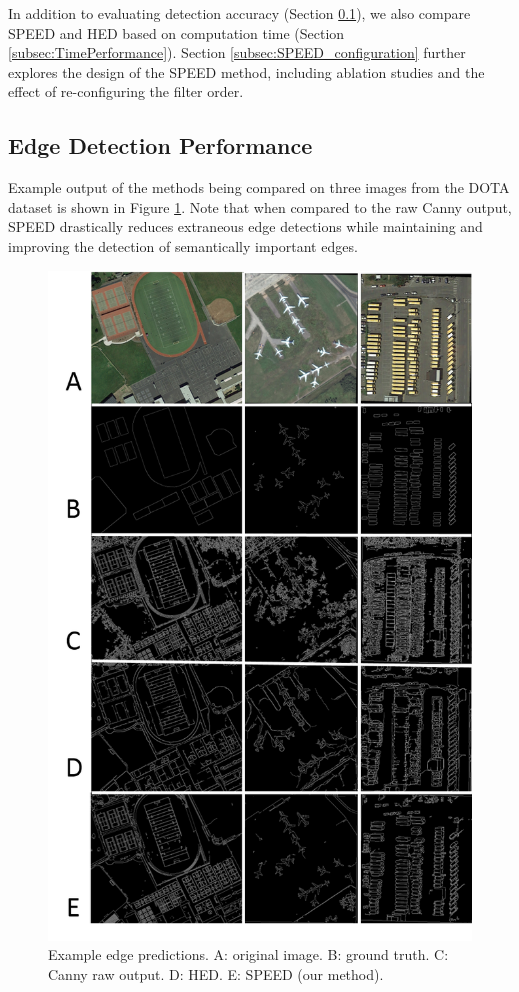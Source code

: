 \documentclass[conference]{IEEEtran}
\begin{document}
In addition to evaluating detection accuracy (Section \ref{subsec:DetectionPerformance}), we also compare SPEED and HED based on computation time (Section \ref{subsec:TimePerformance}). Section \ref{subsec:SPEED_configuration} further explores the design of the SPEED method, including ablation studies and the effect of re-configuring the filter order.

\subsection{Edge Detection Performance}
\label{subsec:DetectionPerformance}

Example output of the methods being compared on three images from the DOTA dataset is shown in Figure \ref{fig:image_stitch}. Note that when compared to the raw Canny output, SPEED drastically reduces extraneous edge detections while maintaining and improving the detection of semantically important edges.

\begin{figure}
\centerline{\includegraphics[width=\linewidth]{stitch.png}}
\caption{Example edge predictions. A: original image. B: ground truth. C: Canny raw output. D: HED. E: SPEED (our method).}
\label{fig:image_stitch}
\end{figure}
\end{document}
